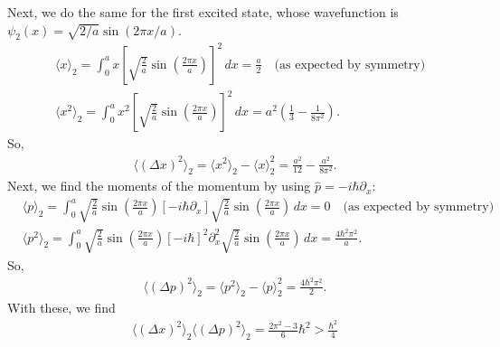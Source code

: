 \documentclass{article}
\theoremstyle{definition}
\newcommand{\p}{\partial}
\newcommand{\f}[2]{\frac{#1}{#2}}
\newcommand{\lp}{\left(}
\newcommand{\rp}{\right)}
\newcommand{\lb}{\left[}
\newcommand{\rb}{\right]}
\begin{document}
Next, we do the same for the first excited state, whose wavefunction is $\psi_2(x)= \sqrt{2/a}\sin(2\pi x/a)$.
\begin{align*}
&\langle x  \rangle_2 = \int_0^a x \lb \sqrt{\f{2}{a}}\sin\lp \f{2\pi x }{a} \rp\rb^2\,dx = \f{a}{2} \quad \text{(as expected by symmetry)}\\
&\langle x^2  \rangle_2 = \int_0^a x^2 \lb \sqrt{\f{2}{a}}\sin\lp \f{2\pi x }{a} \rp\rb^2\,dx = a^2\lp \f{1}{3} - \f{1}{8\pi^2}\rp.
\end{align*}
So,
\begin{align*}
\langle (\Delta x)^2 \rangle_2 = \langle x^2 \rangle_2 - \langle x \rangle^2_2 =  \f{a^2}{12} - \f{a^2}{8\pi^2}.
\end{align*}
Next, we find the moments of the momentum by using $\hat p  = -i\hbar \p_x$:
\begin{align*}
&\langle p  \rangle_2 = \int_0^a \sqrt{\f{2}{a}}\sin\lp \f{2\pi x }{a} \rp
\lb -i\hbar \p_x \rb\sqrt{\f{2}{a}}\sin\lp \f{2\pi x }{a} \rp\,dx = 0 \quad \text{(as expected by symmetry)}\\
&\langle p^2  \rangle_2 = \int_0^a \sqrt{\f{2}{a}}\sin\lp \f{2\pi x }{a} \rp
\lb -i\hbar \rb^2 \p^2_x \sqrt{\f{2}{a}}\sin\lp \f{2\pi x }{a} \rp\,dx = \f{4\hbar^2 \pi^2}{a}.
\end{align*}
So,
\begin{align*}
\langle (\Delta p)^2 \rangle_2 = \langle p^2 \rangle_2 - \langle p \rangle^2_2 =  \f{4\hbar^2 \pi^2}{2}.
\end{align*}
With these, we find 
\begin{align*}
\boxed{\langle (\Delta x)^2 \rangle_2 \langle (\Delta p)^2 \rangle_2 = \f{2\pi^2-3}{6} \hbar^2 > \f{\hbar^2}{4}}
\end{align*}
\end{document}
